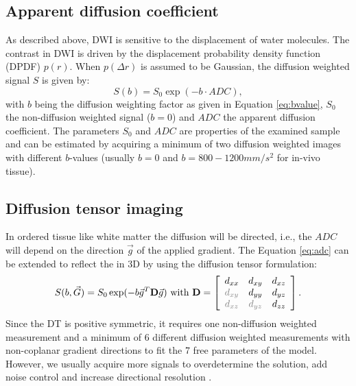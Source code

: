 \subsection*{Apparent diffusion coefficient}
\label{subsec:adc}
As described above, DWI is sensitive to the displacement of water molecules. The contrast in DWI is driven by the displacement probability density function (DPDF) $p(r)$. When $p(\Delta r)$ is assumed to be Gaussian, the diffusion weighted signal $S$ is given by:
\begin{equation}
	S(b) = S_{0}\exp(-b\cdot ADC),
    \label{eq:adc}
\end{equation}
with $b$ being the diffusion weighting factor as given in Equation \ref{eq:bvalue}, $S_{0}$ the non-diffusion weighted signal ($b=0$) and $ADC$ the apparent diffusion coefficient. The parameters $S_0$ and $ADC$ are properties of the examined sample and can be estimated by acquiring a minimum of two diffusion weighted images with different $b$-values (usually $b=0$ and $b=800-1200mm/s^2$ for in-vivo tissue). 
\subsection*{Diffusion tensor imaging}
\label{subsec:dti}
In ordered tissue like white matter the diffusion will be directed, i.e., the $ADC$ will depend on the direction $\vec{g}$ of the applied gradient. The Equation \ref{eq:adc} can be extended to reflect the in 3D by using the diffusion tensor formulation:
\begin{equation}
	S(b,\vec{G}) = S_{0}\exp(-b\vec{g}^T \mat{D}\vec{g}) \mbox{ with } \mat{D} = 
	\left[
	\begin{array}{ccc}
	d_{xx} & d_{xy} & d_{xz} \\
	{\color{gray} d_{xy}} & d_{yy} & d_{yz} \\
	{\color{gray} d_{xz}} & {\color{gray} d_{yz}} & d_{zz} 	
	\end{array} \right].	
    \label{eq:dti}
\end{equation}
Since the DT is positive symmetric, it requires one non-diffusion weighted measurement and a minimum of 6 different diffusion weighted measurements with non-coplanar gradient directions to fit the 7 free parameters of the model. However, we usually acquire more signals to overdetermine the solution, add noise control and increase directional resolution \citep{Jones:2004a}.

